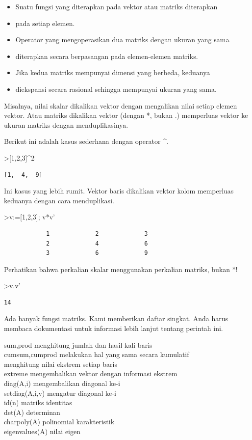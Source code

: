 \documentclass[
]{book}
\begin{document}
\begin{itemize}
\item
  Suatu fungsi yang diterapkan pada vektor atau matriks diterapkan
\item
  pada setiap elemen.
\item
  Operator yang mengoperasikan dua matriks dengan ukuran yang sama
\item
  diterapkan secara berpasangan pada elemen-elemen matriks.
\item
  Jika kedua matriks mempunyai dimensi yang berbeda, keduanya
\item
  diekspansi secara rasional sehingga mempunyai ukuran yang sama.
\end{itemize}

Misalnya, nilai skalar dikalikan vektor dengan mengalikan nilai setiap elemen vektor. Atau matriks dikalikan vektor (dengan *, bukan .) memperluas vektor ke ukuran matriks dengan menduplikasinya.

Berikut ini adalah kasus sederhana dengan operator \^{}.

\textgreater{[}1,2,3{]}\^{}2

\begin{verbatim}
[1,  4,  9]
\end{verbatim}

Ini kasus yang lebih rumit. Vektor baris dikalikan vektor kolom memperluas keduanya dengan cara menduplikasi.

\textgreater v:={[}1,2,3{]}; v*v'

\begin{verbatim}
            1             2             3 
            2             4             6 
            3             6             9 
\end{verbatim}

Perhatikan bahwa perkalian skalar menggunakan perkalian matriks, bukan *!

\textgreater v.v'

\begin{verbatim}
14
\end{verbatim}

Ada banyak fungsi matriks. Kami memberikan daftar singkat. Anda harus membaca dokumentasi untuk informasi lebih lanjut tentang perintah ini.

sum,prod menghitung jumlah dan hasil kali baris\\
cumsum,cumprod melakukan hal yang sama secara kumulatif\\
menghitung nilai ekstrem setiap baris\\
extreme mengembalikan vektor dengan informasi ekstrem\\
diag(A,i) mengembalikan diagonal ke-i\\
setdiag(A,i,v) mengatur diagonal ke-i\\
id(n) matriks identitas\\
det(A) determinan\\
charpoly(A) polinomial karakteristik\\
eigenvalues(A) nilai eigen
\end{document}
